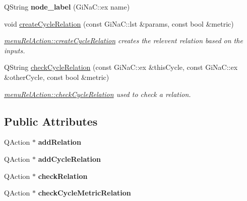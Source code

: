 \begin{DoxyCompactItemize}
\mbox{\label{classmenu_rel_action_a157ae072f7e1622564ff68583bb73132}} 
Q\+String {\bfseries node\+\_\+label} (Gi\+Na\+C\+::ex name)
\item 
void \mbox{\hyperlink{classmenu_rel_action_a64a27674825379ba110fb2117a572ffe}{create\+Cycle\+Relation}} (const Gi\+Na\+C\+::lst \&params, const bool \&metric)
\begin{DoxyCompactList}\small\item\em \mbox{\hyperlink{classmenu_rel_action_a64a27674825379ba110fb2117a572ffe}{menu\+Rel\+Action\+::create\+Cycle\+Relation}} creates the relevent relation based on the inputs. \end{DoxyCompactList}\item 
Q\+String \mbox{\hyperlink{classmenu_rel_action_aae6e2ce0d9d17c13d502984dda8a4a54}{check\+Cycle\+Relation}} (const Gi\+Na\+C\+::ex \&this\+Cycle, const Gi\+Na\+C\+::ex \&other\+Cycle, const bool \&metric)
\begin{DoxyCompactList}\small\item\em \mbox{\hyperlink{classmenu_rel_action_aae6e2ce0d9d17c13d502984dda8a4a54}{menu\+Rel\+Action\+::check\+Cycle\+Relation}} used to check a relation. \end{DoxyCompactList}\end{DoxyCompactItemize}
\subsection*{Public Attributes}
\begin{DoxyCompactItemize}
\item 
\mbox{\label{classmenu_rel_action_ad9c9c61008821fcef78633ed38b42f8c}} 
Q\+Action $\ast$ {\bfseries add\+Relation}
\item 
\mbox{\label{classmenu_rel_action_ab78b5ed63bee30881b70110161670fb5}} 
Q\+Action $\ast$ {\bfseries add\+Cycle\+Relation}
\item 
\mbox{\label{classmenu_rel_action_afa273b825fbdc2d887cc6a3ecfc62265}} 
Q\+Action $\ast$ {\bfseries check\+Relation}
\item 
\mbox{\label{classmenu_rel_action_a7937666c8189cb7597874642917e83ec}} 
Q\+Action $\ast$ {\bfseries check\+Cycle\+Metric\+Relation}
\end{DoxyCompactItemize}


